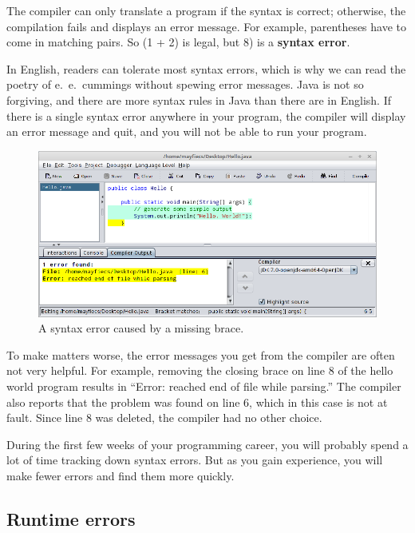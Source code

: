 The compiler can only translate a program if the syntax is correct; otherwise, the compilation fails and displays an error message.
For example, parentheses have to come in matching pairs.
So (1 + 2) is legal, but 8) is a {\bf syntax error}.

In English, readers can tolerate most syntax errors, which is why we can read the poetry of e.\ e.\ cummings without spewing error messages.
Java is not so forgiving, and there are more syntax rules in Java than there are in English.
If there is a single syntax error anywhere in your program, the compiler will display an error message and quit, and you will not be able to run your program.

\begin{figure}[h!]
\includegraphics[width=\textwidth]{syntax-error.png}
\caption{A syntax error caused by a missing brace.}
\end{figure}

To make matters worse, the error messages you get from the compiler are often not very helpful.
For example, removing the closing brace on line 8 of the hello world program results in ``Error: reached end of file while parsing.''
The compiler also reports that the problem was found on line 6, which in this case is not at fault.
Since line 8 was deleted, the compiler had no other choice.

During the first few weeks of your programming career, you will probably spend a lot of time tracking down syntax errors.
But as you gain experience, you will make fewer errors and find them more quickly.

\subsection{Runtime errors}


